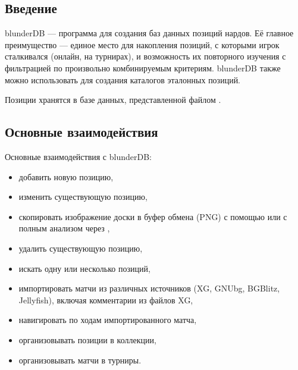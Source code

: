 \documentclass[letterpaper,10pt,russian]{sphinxmanual}
\begin{document}
\subsection{Введение}
\label{\detokenize{manuel:introduction}}
\sphinxAtStartPar
blunderDB — программа для создания баз данных позиций нардов. Её главное преимущество — единое место для накопления позиций, с которыми игрок сталкивался (онлайн, на турнирах), и возможность их повторного изучения с фильтрацией по произвольно комбинируемым критериям. blunderDB также можно использовать для создания каталогов эталонных позиций.

\sphinxAtStartPar
Позиции хранятся в базе данных, представленной файлом .


\subsection{Основные взаимодействия}
\label{\detokenize{manuel:interactions-principales}}
\sphinxAtStartPar
Основные взаимодействия с blunderDB:
\begin{itemize}
\item {} 
\sphinxAtStartPar
добавить новую позицию,

\item {} 
\sphinxAtStartPar
изменить существующую позицию,

\item {} 
\sphinxAtStartPar
скопировать изображение доски в буфер обмена (PNG) с помощью  или с полным анализом через ,

\item {} 
\sphinxAtStartPar
удалить существующую позицию,

\item {} 
\sphinxAtStartPar
искать одну или несколько позиций,

\item {} 
\sphinxAtStartPar
импортировать матчи из различных источников (XG, GNUbg, BGBlitz, Jellyfish), включая комментарии из файлов XG,

\item {} 
\sphinxAtStartPar
навигировать по ходам импортированного матча,

\item {} 
\sphinxAtStartPar
организовывать позиции в коллекции,

\item {} 
\sphinxAtStartPar
организовывать матчи в турниры.

\end{itemize}
\end{document}
